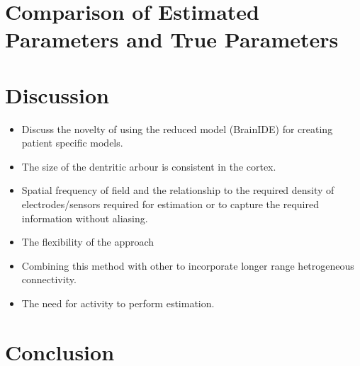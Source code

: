 \documentclass[onecolumn,draftcls]{IEEEtran}
\begin{document}
\section{Comparison of Estimated Parameters and True Parameters}

\section{Discussion}
\begin{itemize}

	\item Discuss the novelty of using the reduced model (BrainIDE) for creating patient specific models. 
	\item The size of the dentritic arbour is consistent in the cortex.
	\item Spatial frequency of field and the relationship to the required density of electrodes/sensors required for estimation or to capture the required information without aliasing.
	
	\item The flexibility of the approach
	
	\item Combining this method with other to incorporate longer range hetrogeneous connectivity.
	
	\item The need for activity to perform estimation.
\end{itemize}

\section{Conclusion}

\appendices
\end{document}
